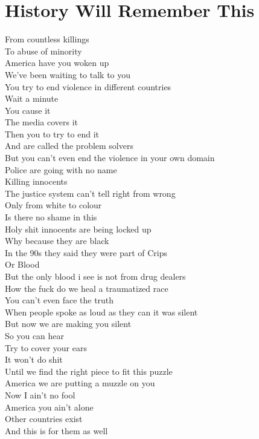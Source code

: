 \documentclass[12pt, b5paper]{article}
\begin{document}
\section{History Will Remember This}
\par From countless killings
\\To abuse of minority
\\America have you woken up
\\We've been waiting to talk to you
\\You try to end violence in different countries
\\Wait a minute
\\You cause it
\\The media covers it
\\Then you to try to end it
\\And are called the problem solvers
\\But you can't even end the violence in your own domain
\\Police are going with no name
\\Killing innocents
\\The justice system can't tell right from wrong
\\Only from white to colour
\\Is there no shame in this
\\Holy shit innocents are being locked up
\\Why because they are black
\\In the 90s they said they were part of Crips
\\Or Blood
\\But the only blood i see is not from drug dealers
\\How the fuck do we heal a traumatized race
\\You can't even face the truth
\\When people spoke as loud as they can it was silent
\\But now we are making you silent
\\So you can hear
\\Try to cover your ears
\\It won't do shit
\\Until we find the right piece to fit this puzzle
\\America we are putting a muzzle on you
\\Now I ain't no fool
\\America you ain't alone
\\Other countries exist
\\And this is for them as well
\end{document}

